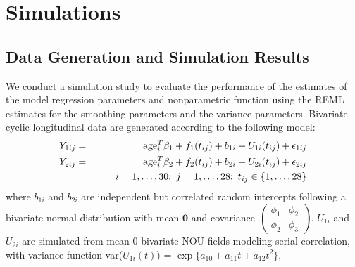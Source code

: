 \documentclass[12pt, notitlepage]{article}
\begin{document}
%
%
%

\section{Simulations} \label{simulation}

\subsection{Data Generation and Simulation Results}

We conduct a  simulation study to evaluate the performance of the estimates of the model regression parameters and nonparametric function using the REML estimates for the smoothing parameters and the variance parameters. Bivariate cyclic longitudinal data are generated according to the following model:
\begin{eqnarray*}
Y_{1ij} &=& {\rm age}_i^T  \beta_1 + f_1(t_{ij}) + b_{1i} + U_{1i}(t_{ij}) + \epsilon_{1ij}  \\
Y_{2ij} &=& {\rm age}_i^T  \beta_2 + f_2(t_{ij}) + b_{2i} + U_{2i}(t_{ij}) + \epsilon_{2ij} \\
&& \quad\quad i = 1, \dots, 30; \ j = 1, \dots, 28; \ t_{ij} \in \{1, \dots, 28\}
\end{eqnarray*}
where $ b_{1i}$ and $ b_{2i}$ are independent but correlated random intercepts following a bivariate normal distribution with mean $\bm 0$ and covariance 
$
\begin{pmatrix}
\phi_{1} &   \phi_{2}  \\
\phi_{2} &   \phi_{3} 
\end{pmatrix}.
$
$U_{1i}$ and $U_{2i}$ are simulated from mean $0$ bivariate NOU fields modeling serial correlation, with variance function 
var($U_{1i}(t)$) = $\exp\{a_{10} + a_{11}t + a_{12}t^2 \}$,
\end{document}

